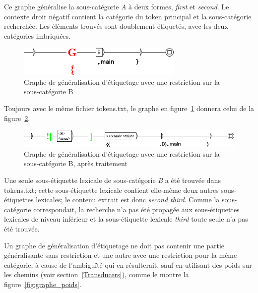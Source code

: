 \bigskip
\noindent Ce graphe généralise la sous-catégorie \textit{A} à deux formes,
\textit{first} et \textit{second}. Le contexte droit négatif
contient la catégorie du token principal et la sous-catégorie recherchée.
Les éléments trouvés sont doublement étiquetés, avec les deux catégories imbriquées.

\begin{figure}[!htb]
  \centering
  \includegraphics[width=8cm]{resources/img/graphe_restriction_B.png}
  \caption{Graphe de généralisation d'étiquetage avec une restriction sur la sous-catégorie B}
  \label{fig:graphe_restriction_B}
\end{figure}

\bigskip
\noindent Toujours avec le même fichier tokens.txt, le graphe en
figure~\ref{fig:graphe_restriction_B} donnera celui de la
figure~\ref{fig:graphe_restriction_B_genere}.

\begin{figure}[!htb]
  \centering
  \includegraphics[width=14cm]{resources/img/graphe_restriction_B_genere.png}
  \caption{Graphe de généralisation d'étiquetage avec une restriction sur la sous-catégorie B,
  après traitement}
  \label{fig:graphe_restriction_B_genere}
\end{figure}

\bigskip
\noindent Une seule sous-étiquette
lexicale de sous-catégorie \textit{B} a été trouvée dans tokens.txt; cette sous-étiquette lexicale contient
elle-même deux autres sous-étiquettes lexicales; le contenu extrait est donc \textit{second third}.
Comme la sous-catégorie correspondait, la recherche n'a pas été propagée aux sous-étiquettes lexicales
de niveau inférieur et la sous-étiquette lexicale \textit{third} toute seule n'a pas été trouvée.

\bigskip
\noindent Un graphe de généralisation d'étiquetage ne doit pas contenir une partie généralisante
sans restriction et une autre avec une restriction pour la même catégorie, à cause de
l'ambiguïté qui en résulterait, sauf en utilisant des poids sur les chemins (voir
section~\ref{Transducers}), comme le montre la figure~\ref{fig:graphe_poids}.

